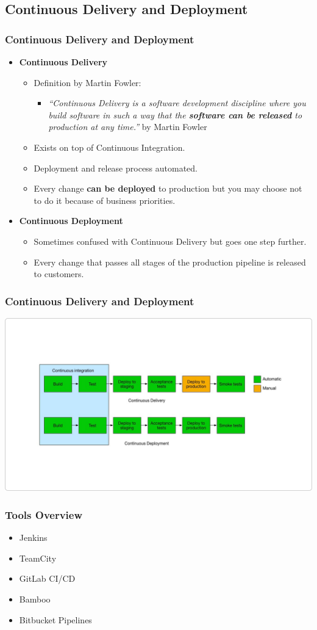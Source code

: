 \subsection[]{Continuous Delivery and Deployment}
\begin{frame}
\frametitle{Continuous Delivery and Deployment}
\begin{itemize}
	\item \textbf{Continuous Delivery}
		\begin{itemize}%
		\item Definition by Martin Fowler:
			\begin{itemize}
			\item \emph{“Continuous Delivery is a software development discipline where you build software in such a way that the \textbf{software can be released} to production at any time.”} by Martin Fowler
			\end{itemize}
		\item Exists on top of Continuous Integration.
		\item Deployment and release process automated.
		\item Every change \textbf{can be deployed} to production but you may choose not to do it because of business priorities.
		\end{itemize}
	\item \textbf{Continuous Deployment}
		\begin{itemize}
		\item Sometimes confused with Continuous Delivery but goes one step further.
		\item Every change that passes all stages of the production pipeline is released to customers.
		\end{itemize}
\end{itemize}
\end{frame}

\begin{frame}
\frametitle{Continuous Delivery and Deployment}
\includegraphics[width=\textwidth, height=0.56\textwidth]{cont-delivery-deployment.png}
\end{frame}

\begin{frame}
\frametitle{Tools Overview}
\begin{itemize}
	\item Jenkins
	\item TeamCity
	\item GitLab CI/CD
	\item Bamboo
	\item Bitbucket Pipelines
\end{itemize}
\end{frame}
